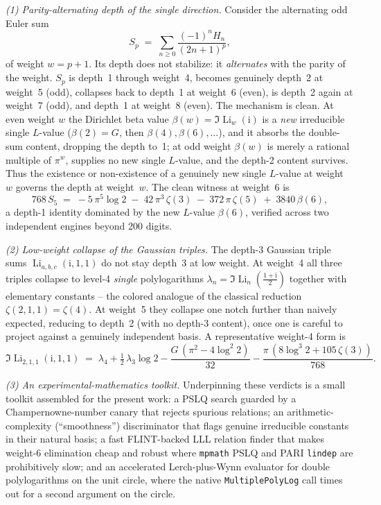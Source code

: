 \documentclass[11pt]{article}
\DeclareMathOperator{\Li}{Li}
\newcommand{\iu}{\mathrm{i}}
\theoremstyle{plain}
\theoremstyle{remark}
\begin{document}
\emph{(1) Parity-alternating depth of the single direction.} Consider the alternating odd Euler sum
\[
  S_p \;=\; \sum_{n\ge0} \frac{(-1)^n H_n}{(2n+1)^{p}},
\]
of weight $w=p+1$. Its depth does not stabilize: it \emph{alternates} with the parity of the weight. $S_p$ is depth~1 through weight~4, becomes genuinely depth~2 at weight~5 (odd), collapses back to depth~1 at weight~6 (even), is depth~2 again at weight~7 (odd), and depth~1 at weight~8 (even). The mechanism is clean. At even weight $w$ the Dirichlet beta value $\beta(w)=\Im\Li_w(\iu)$ is a \emph{new} irreducible single $L$-value ($\beta(2)=G$, then $\beta(4),\beta(6),\dots$), and it absorbs the double-sum content, dropping the depth to~1; at odd weight $\beta(w)$ is merely a rational multiple of $\pi^w$, supplies no new single $L$-value, and the depth-2 content survives. Thus the existence or non-existence of a genuinely new single $L$-value at weight~$w$ governs the depth at weight~$w$. The clean witness at weight~6 is
\[
  768\,S_5 \;=\; -5\,\pi^5\log 2 \;-\; 42\,\pi^3\,\zeta(3) \;-\; 372\,\pi\,\zeta(5) \;+\; 3840\,\beta(6),
\]
a depth-1 identity dominated by the new $L$-value $\beta(6)$, verified across two independent engines beyond 200 digits.

\emph{(2) Low-weight collapse of the Gaussian triples.} The depth-3 Gaussian triple sums $\Li_{a,b,c}(\iu,1,1)$ do not stay depth~3 at low weight. At weight~4 all three triples collapse to level-4 \emph{single} polylogarithms $\lambda_n=\Im\Li_n(\tfrac{1+\iu}{2})$ together with elementary constants -- the colored analogue of the classical reduction $\zeta(2,1,1)=\zeta(4)$. At weight~5 they collapse one notch further than naively expected, reducing to depth~2 (with no depth-3 content), once one is careful to project against a genuinely independent basis. A representative weight-4 form is
\[
  \Im\Li_{2,1,1}(\iu,1,1) \;=\; \lambda_4 + \tfrac12\,\lambda_3\log 2 - \frac{G\,(\pi^2-4\log^2 2)}{32} - \frac{\pi\,(8\log^3 2 + 105\,\zeta(3))}{768}.
\]

\emph{(3) An experimental-mathematics toolkit.} Underpinning these verdicts is a small toolkit assembled for the present work: a PSLQ search guarded by a Champernowne-number canary that rejects spurious relations; an arithmetic-complexity (``smoothness'') discriminator that flags genuine irreducible constants in their natural basis; a fast \mbox{FLINT}-backed LLL relation finder that makes weight-6 elimination cheap and robust where \texttt{mpmath} PSLQ and PARI \texttt{lindep} are prohibitively slow; and an accelerated Lerch-plus-Wynn evaluator for double polylogarithms on the unit circle, where the native \texttt{MultiplePolyLog} call times out for a second argument on the circle.
\end{document}
